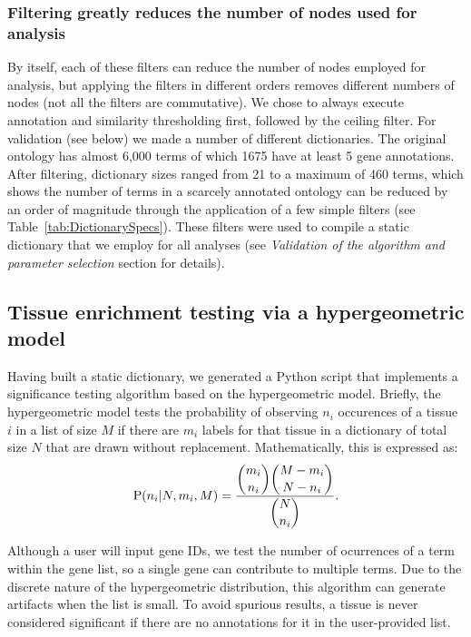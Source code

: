 \documentclass{bmcart}
\begin{document}
\subsubsection*{Filtering greatly reduces the number of nodes used for analysis}
By itself, each of these filters can reduce the number of nodes employed for analysis, but applying the filters in different orders removes different numbers of nodes (not all the filters are commutative). We chose to always execute annotation and similarity thresholding first, followed by the ceiling filter.
For validation (see below) we made a number of different dictionaries. The original ontology has almost 6,000 terms of which 1675 have at least 5 gene annotations. After filtering, dictionary sizes ranged from 21 to a maximum of 460 terms, which shows the number of terms in a scarcely annotated ontology can be reduced by an order of magnitude through the application of a few simple filters (see Table~\ref{tab:DictionarySpecs}). These filters were used to compile a static dictionary that we employ for all analyses (see \emph{Validation of the algorithm and parameter selection} section for details). 

\subsection*{Tissue enrichment testing via a hypergeometric model}
Having built a static dictionary, we generated a Python script that implements a significance testing algorithm based on the hypergeometric model. Briefly, the hypergeometric model tests the probability of observing $n_i$ occurences of a tissue $i$ in a list of size $M$ if there are $m_i$ labels for that tissue in a dictionary of total size $N$ that are drawn without replacement. Mathematically, this is expressed as: 
\begin{eqnarray}\label{hypergeometric}
	\mathrm{P}(n_i | N, m_i, M) = \frac{\dbinom{m_i}{n_i} \dbinom{M-m_i}{N - n_i}}{\dbinom{N}{n_i}}\text{.}
\end{eqnarray}

Although a user will input gene IDs, we test the number of ocurrences of a term within the gene list, so a single gene can contribute to multiple terms. Due to the discrete nature of the hypergeometric distribution, this algorithm can generate artifacts when the list is small. To avoid spurious results, a tissue is never considered significant if there are no annotations for it in the user-provided list.
\end{document}
